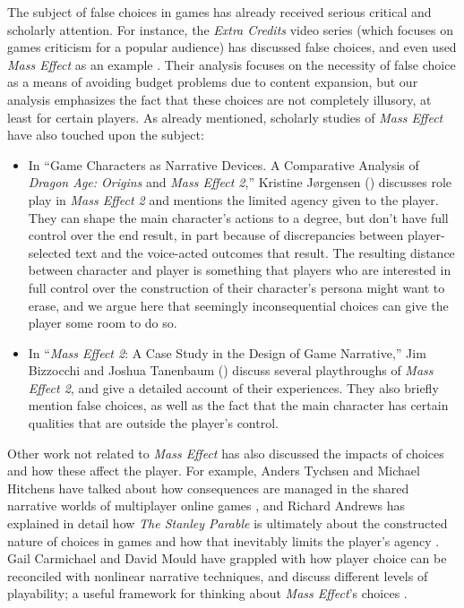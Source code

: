 \documentclass[arts,article,submit,moreauthors,pdftex,10pt,a4paper]{Definitions/mdpi}
\begin{document}
The subject of false choices in games has already received serious critical and scholarly attention.
%
For instance, the \emph{Extra Credits} video series (which focuses on games criticism for a popular audience) has discussed false choices, and even used \emph{Mass Effect} as an example \citep{floyd2013illusion}.
%
Their analysis focuses on the necessity of false choice as a means of avoiding budget problems due to content expansion, but our analysis emphasizes the fact that these choices are not completely illusory, at least for certain players.
%
As already mentioned, scholarly studies of \emph{Mass Effect} have also touched upon the subject:
\begin{itemize}
  \item In ``Game Characters as Narrative Devices. {A} Comparative Analysis of \emph{Dragon Age: Origins} and \emph{Mass Effect 2},'' Kristine J{\o}rgensen (\citeyear{jorgensen2010game}) discusses role play in \emph{Mass Effect 2} and mentions the limited agency given to the player. They can shape the main character's actions to a degree, but don't have full control over the end result, in part because of discrepancies between player-selected text and the voice-acted outcomes that result. The resulting distance between character and player is something that players who are interested in full control over the construction of their character's persona might want to erase, and we argue here that seemingly inconsequential choices can give the player some room to do so.
  \item In ``\emph{Mass Effect 2}: A Case Study in the Design of Game Narrative,'' Jim Bizzocchi and Joshua Tanenbaum (\citeyear{bizzocchi2012mass}) discuss several playthroughs of \emph{Mass Effect 2}, and give a detailed account of their experiences. They also briefly mention false choices, as well as the fact that the main character has certain qualities that are outside the player's control.
\end{itemize}

Other work not related to \emph{Mass Effect} has also discussed the impacts of choices and how these affect the player.
%
For example, Anders Tychsen and Michael Hitchens have talked about how consequences are managed in the shared narrative worlds of multiplayer online games \citep{tychsen2006ghost}, and Richard Andrews has explained in detail how \emph{The Stanley Parable} is ultimately about the constructed nature of choices in games and how that inevitably limits the player's agency \citep{andrews2017metagames}.
%
Gail Carmichael and David Mould have grappled with how player choice can be reconciled with nonlinear narrative techniques, and discuss different levels of playability; a useful framework for thinking about \emph{Mass Effect}'s choices \citep{carmichael2014chronologically}.
\end{document}
